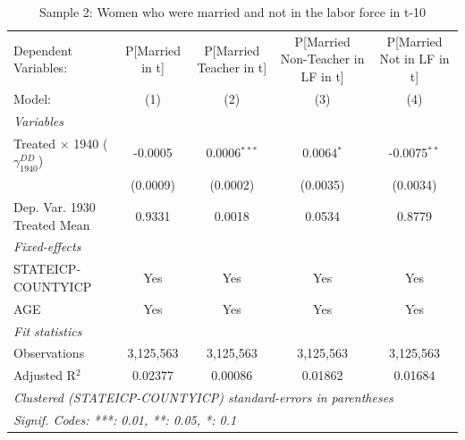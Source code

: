 
\begin{table}[htbp]
   \caption{Sample 2: Women who were married and not in the labor force in t-10}
   \centering
   \begin{tabular}{lcccc}
      \tabularnewline \midrule \midrule
      Dependent Variables:                           & P[Married in t] & P[Married Teacher in t] & P[Married Non-Teacher in LF in t] & P[Married Not in LF in t]\\  
      Model:                                         & (1)             & (2)                     & (3)                               & (4)\\  
      \midrule
      \emph{Variables}\\
      Treated $\times$ 1940 ($\gamma_{1940}^{DD}$)   & -0.0005         & 0.0006$^{***}$          & 0.0064$^{*}$                      & -0.0075$^{**}$\\   
                                                     & (0.0009)        & (0.0002)                & (0.0035)                          & (0.0034)\\   
      Dep. Var. 1930 Treated Mean                    & 0.9331          & 0.0018                  & 0.0534                            & 0.8779\\  
      \midrule
      \emph{Fixed-effects}\\
      STATEICP-COUNTYICP                             & Yes             & Yes                     & Yes                               & Yes\\  
      AGE                                            & Yes             & Yes                     & Yes                               & Yes\\  
      \midrule
      \emph{Fit statistics}\\
      Observations                                   & 3,125,563       & 3,125,563               & 3,125,563                         & 3,125,563\\  
      Adjusted R$^2$                                 & 0.02377         & 0.00086                 & 0.01862                           & 0.01684\\  
      \midrule \midrule
      \multicolumn{5}{l}{\emph{Clustered (STATEICP-COUNTYICP) standard-errors in parentheses}}\\
      \multicolumn{5}{l}{\emph{Signif. Codes: ***: 0.01, **: 0.05, *: 0.1}}\\
   \end{tabular}
\end{table}


